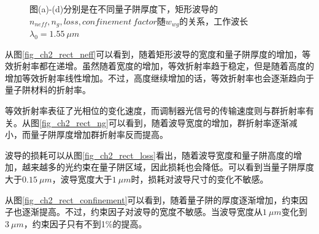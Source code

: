 \begin{figure}[htb]
{\begin{minipage}[]{0.5\textwidth}
	\end{minipage}}
\caption{图(a)-(d)分别是在不同量子阱厚度下，矩形波导的$n_{neff}, n_g, loss, confinement~factor$随$w_{wg}$的关系，工作波长$\lambda_0 = 1.55~\mu m$}
\label{fig_ch2_rect_property}
\end{figure}

从图\ref{fig_ch2_rect_neff}可以看到，随着矩形波导的宽度和量子阱厚度的增加，等效折射率都在递增。虽然随着宽度的增加，等效折射率趋于稳定，但是随着高度的增加等效折射率线性增加。不过，高度继续增加的话，等效折射率也会逐渐趋向于量子阱材料的折射率。

等效折射率表征了光相位的变化速度，而调制器光信号的传输速度则与群折射率有关。从图\ref{fig_ch2_rect_ng}可以看到，随着波导宽度的增加，群折射率逐渐减小，而量子阱厚度增加群折射率反而提高。

波导的损耗可以从图\ref{fig_ch2_rect_loss}看出，随着波导宽度和量子阱高度的增加，越来越多的光约束在量子阱区域，因此损耗也会降低。可以看到当量子阱厚度大于$0.15~ \mu m$，波导宽度大于$1~ \mu m$时，损耗对波导尺寸的变化不敏感。

从图\ref{fig_ch2_rect_confinement}可以看到，随着量子阱的厚度逐渐增加，约束因子也逐渐提高。不过，约束因子对波导的宽度不敏感。当波导宽度从$1 ~\mu m$变化到$3 ~\mu m$，约束因子只有不到1\%的提高。

